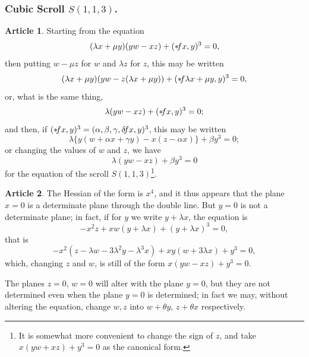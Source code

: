 \documentclass[12pt,a4paper]{article}
\theoremstyle{definition}
\newtheorem{art}{Article}[section]
\begin{document}
\subsubsection*{Cubic Scroll $S(1, 1, 3)$.}

\begin{art}
Starting from the equation
\[
(\lambda x + \mu y)(yw - xz) + (* \hspace{-2pt} fx, y)^3 = 0,
\]
then putting $w - \mu z$ for $w$ and $\lambda z$ for $z$, this may be written
\[
(\lambda x + \mu y)(yw - z(\lambda x + \mu y)) + (* \hspace{-2pt} f\lambda x + \mu y, y)^3 = 0,
\]
or, what is the same thing,
\[
\lambda (yw - xz) + (* \hspace{-2pt} fx, y)^3 = 0;
\]
and then, if $(* \hspace{-2pt} fx, y)^3 = (\alpha, \beta, \gamma, \delta \hspace{-2pt} fx, y)^3$, this may be written
\[
\lambda \{y(w + \alpha x + \gamma y) - x(z - \alpha x)\} + \beta y^3 = 0;
\]
or changing the values of $w$ and $z$, we have
\[
\lambda (yw - xz) + \beta y^3 = 0
\]
for the equation of the scroll $S(1, 1, 3)$\footnote{It is somewhat more convenient to change the sign of $z$, and take $x(yw + xz) + y^3 = 0$ as the canonical form.}.
\end{art}

\begin{art}
The Hessian of the form is $x^4$, and it thus appears that the plane $x = 0$ is a determinate plane through the double line. But $y = 0$ is not a determinate plane; in fact, if for $y$ we write $y + \lambda x$, the equation is
\[
-x^2 z + xw(y + \lambda x) + (y + \lambda x)^3 = 0,
\]
that is
\[
-x^2(z - \lambda w - 3\lambda^2 y - \lambda^3 x) + xy(w + 3\lambda x) + y^3 = 0,
\]
which, changing $z$ and $w$, is still of the form $x(yw - xz) + y^3 = 0$.

The planes $z = 0$, $w = 0$ will alter with the plane $y = 0$, but they are not determined even when the plane $y = 0$ is determined; in fact we may, without altering the equation, change $w, z$ into $w + \theta y$, $z + \theta x$ respectively.
\end{art}
\end{document}
